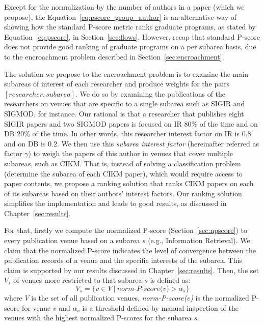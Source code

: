 \documentclass[msc]{ppgccufmg}
\begin{document}
Except for the normalization by the number of authors in a paper (which we propose), the Equation~\ref{eq:pscore_group_author} is an alternative way of showing how the standard P-score metric ranks graduate programs, as stated by Equation~\ref{eq:pscore}, in Section~\ref{sec:flows}. However, recap that standard P-score does not provide good ranking of graduate programs on a per subarea basis, due to the encroachment problem described in Section~\ref{sec:encroachment}. 

The solution we propose to the encroachment problem is to examine the main subareas of interest of each researcher and produce weights for the pairs $[researcher, subarea]$. We do so by examining the publications of the researchers on venues that are specific to a single subarea such as SIGIR and SIGMOD, for instance. Our rational is that a researcher that publishes eight SIGIR papers and two SIGMOD papers is focused on IR $80\%$ of the time and on DB 20\% of the time. 
%
In other words, this researcher interest factor on IR is 0.8 and on DB is 0.2. We then use this \textit{subarea interest factor} (hereinafter referred as factor $\gamma$) to weigh the papers of this author in venues that cover multiple subareas, such as CIKM. That is, instead of solving a classification problem (determine the subarea of each CIKM paper), which would require access to paper contents, we propose a ranking solution that ranks CIKM papers on each of its subareas based on their authors' interest factors. Our ranking solution simplifies the implementation and leads to good results, as discussed in Chapter~\ref{sec:results}.

For that, firstly we compute the normalized P-score (Section~\ref{sec:npscore}) to every publication venue based on a subarea $s$ (e.g., Information Retrieval). We claim that the normalized P-score indicates the level of convergence between the publication records of a venue and the specific interests of the subarea. This claim is supported by our results discussed in Chapter~\ref{sec:results}. Then, the set $V_s$ of venues more restricted to that subarea $s$ is defined as:
\begin{equation}
	V_s = \{v \in V\ |\ \textit{norm-P-score($v$)} > \alpha_s\}
\end{equation}
where $V$ is the set of all publication venues, \textit{norm-P-score($v$)} is the normalized P-score for venue $v$ and $\alpha_s$ is a threshold defined by manual inspection of the venues with the highest normalized P-scores for the subarea $s$. 
\end{document}
